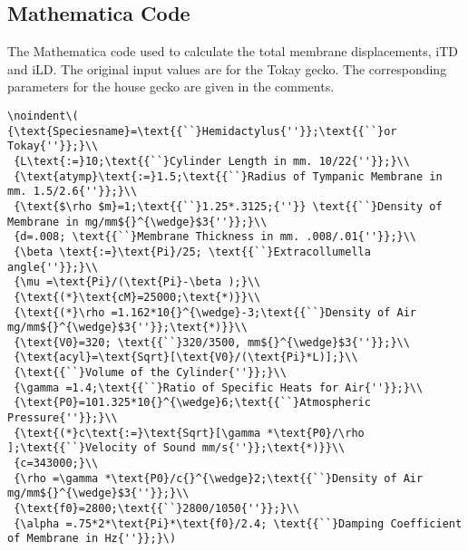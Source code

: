\begin{appendix}


% 
% 
% 
% 
\chapter{Mathematica Code}\label{codeappendix}
The Mathematica code used to calculate the total membrane displacements, iTD and iLD. The original input values are
for the Tokay gecko. The corresponding parameters for the house gecko are given in the comments.

\begin{verbatim}
\noindent\( {\text{Speciesname}=\text{{``}Hemidactylus{''}};\text{{``}or Tokay{''}};}\\
 {L\text{:=}10;\text{{``}Cylinder Length in mm. 10/22{''}};}\\
 {\text{atymp}\text{:=}1.5;\text{{``}Radius of Tympanic Membrane in mm. 1.5/2.6{''}};}\\
 {\text{$\rho $m}=1;\text{{``}1.25*.3125;{''}} \text{{``}Density of Membrane in mg/mm${}^{\wedge}$3{''}};}\\
 {d=.008; \text{{``}Membrane Thickness in mm. .008/.01{''}};}\\
 {\beta \text{:=}\text{Pi}/25; \text{{``}Extracollumella angle{''}};}\\
 {\mu =\text{Pi}/(\text{Pi}-\beta );}\\
 {\text{(*}\text{cM}=25000;\text{*)}}\\
 {\text{(*}\rho =1.162*10{}^{\wedge}-3;\text{{``}Density of Air mg/mm${}^{\wedge}$3{''}};\text{*)}}\\
 {\text{V0}=320; \text{{``}320/3500, mm${}^{\wedge}$3{''}};}\\
 {\text{acyl}=\text{Sqrt}[\text{V0}/(\text{Pi}*L)];}\\
 {\text{{``}Volume of the Cylinder{''}};}\\
 {\gamma =1.4;\text{{``}Ratio of Specific Heats for Air{''}};}\\
 {\text{P0}=101.325*10{}^{\wedge}6;\text{{``}Atmospheric Pressure{''}};}\\
 {\text{(*}c\text{:=}\text{Sqrt}[\gamma *\text{P0}/\rho ];\text{{``}Velocity of Sound mm/s{''}};\text{*)}}\\
 {c=343000;}\\
 {\rho =\gamma *\text{P0}/c{}^{\wedge}2;\text{{``}Density of Air mg/mm${}^{\wedge}$3{''}};}\\
 {\text{f0}=2800;\text{{``}2800/1050{''}};}\\
 {\alpha =.75*2*\text{Pi}*\text{f0}/2.4; \text{{``}Damping Coefficient of Membrane in Hz{''}};}\)
\end{verbatim}


\end{appendix}
